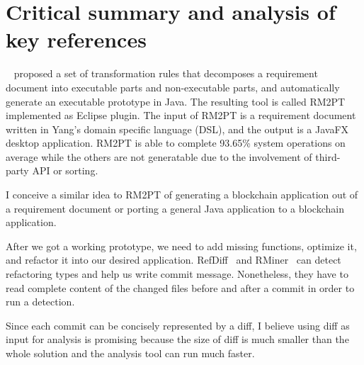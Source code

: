 \section{Critical summary and analysis of key references}

~\cite{yang2019automated} proposed a set of transformation rules that decomposes a requirement document into executable parts and non-executable parts, and automatically generate an executable prototype in Java.
The resulting tool is called RM2PT implemented as Eclipse plugin. The input of RM2PT is a requirement document written in Yang's domain specific language (DSL), and the output is a JavaFX desktop application. RM2PT is able to complete 93.65\% system operations on average while the others are not generatable due to the involvement of third-party API or sorting.

I conceive a similar idea to RM2PT of generating a blockchain application out of a requirement document or porting a general Java application to a blockchain application.

After we got a working prototype, we need to add missing functions, optimize it, and refactor it into our desired application.
RefDiff~\cite{silva2020refdiff} and RMiner~\cite{tsantalis2018accurate} can detect refactoring types and help us write commit message. Nonetheless, they have to read complete content of the changed files before and after a commit in order to run a detection.

Since each commit can be concisely represented by a diff, I believe using diff as input for analysis is promising because the size of diff is much smaller than the whole solution and the analysis tool can run much faster.